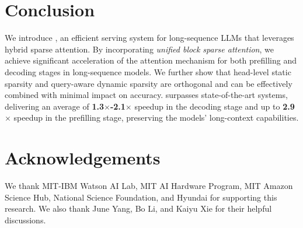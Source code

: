 \section{Conclusion}
\label{sect:conclusion}

We introduce \system, an efficient serving system for long-sequence LLMs that leverages hybrid sparse attention. By incorporating \textit{unified block sparse attention}, we achieve significant acceleration of the attention mechanism for both prefilling and decoding stages in long-sequence models. We further show that head-level static sparsity and query-aware dynamic sparsity are orthogonal and can be effectively combined with minimal impact on accuracy. \system surpasses state-of-the-art systems, delivering an average of \textbf{1.3$\times$-2.1$\times$} speedup in the decoding stage and up to \textbf{2.9$\times$} speedup in the prefilling stage, preserving the models' long-context capabilities.




\section*{Acknowledgements}
We thank MIT-IBM Watson AI Lab, MIT AI Hardware Program, MIT Amazon Science Hub, National Science Foundation, and Hyundai for supporting this research. We also thank June Yang, Bo Li, and Kaiyu Xie for their helpful discussions. 


\newpage
